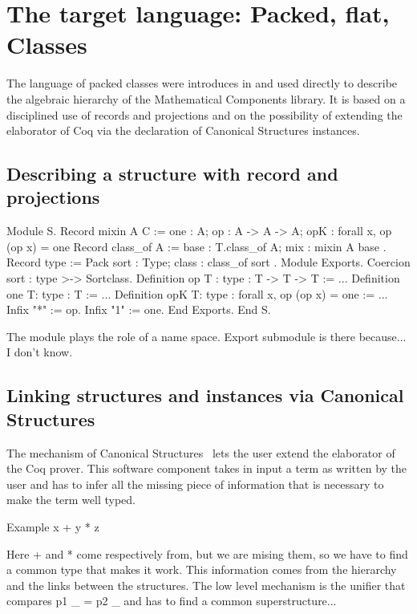 \documentclass[a4paper,UKenglish,cleveref, autoref]{lipics-v2019}
\begin{document}
\section{The target language: Packed, flat, Classes}
The language of packed classes were introduces in
\cite{DBLP:conf/tphol/GarillotGMR09} and used directly to describe the
algebraic hierarchy of the Mathematical Components library.
It is based on a disciplined use of records and projections and
on the possibility of extending the elaborator of Coq
via the declaration of Canonical Structures instances.

\subsection{Describing a structure with record and projections}

\begin{coqcode}
Module S.
  Record mixin A C := {
    one : A;
    op : A -> A -> A;
    opK : forall x, op (op x) = one
  }
  Record class_of A := {
    base : T.class_of A;
    mix  : mixin A base
  }.
  Record type := Pack {
    sort : Type;
    class : class_of sort
  }.
  Module Exports.
    Coercion sort : type >-> Sortclass.
    Definition op {T : type} : T -> T -> T := ...
    Definition one {T:  type} : T := ...
    Definition opK {T:  type} : forall x, op (op x) = one := ...
    Infix "*" := op.
    Infix "1" := one.
  End Exports.
End S.
\end{coqcode}

The module plays the role of a name space.
Export submodule is there because... I don't know.

\subsection{Linking structures and instances via Canonical Structures}

The mechanism of Canonical Structures~\cite{DBLP:conf/itp/MahboubiT13}
lets the user extend the elaborator of the Coq prover. This software component
takes in input a term as written by the user and has to infer all the missing
piece of information that is necessary to make the term well typed.

Example x + y * z

Here + and * come respectively from, but we are mising them, so we have
to find a common type that makes it work. This information comes from
the hierarchy and the links between the structures. The low level mechanism
is the unifier that compares p1 \_ = p2 \_ and has to find a common
superstructure...
\end{document}
